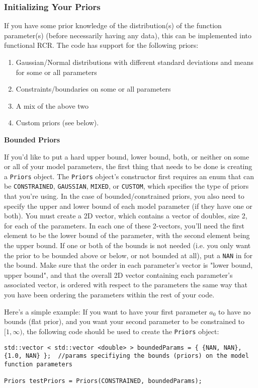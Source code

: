 \documentclass[12pt]{article}
\newcommand{\li}{\lstinline}
\begin{document}
\subsubsection{Initializing Your Priors}
\par If you have some prior knowledge of the distribution(s) of the function parameter(s) (before necessarily having any data), this can be implemented into functional RCR. The code has support for the following priors:
\begin{enumerate}
	\item Gaussian/Normal distributions with different standard deviations and means for some or all parameters
	\item Constraints/boundaries on some or all parameters
	\item A mix of the above two
	\item Custom priors (see below).
\end{enumerate} 
\textbf{Bounded Priors}
\par If you'd like to put a hard upper bound, lower bound, both, or neither on some or all of your model parameters, the first thing that needs to be done is creating a \lstinline{Priors} object. The \li{Priors} object's constructor first requires an enum that can be \li{CONSTRAINED}, \li{GAUSSIAN}, \li{MIXED}, or \li{CUSTOM}, which specifies the type of priors that you're using. In the case of bounded/constrained priors, you also need to specify the upper and lower bound of each model parameter (if they have one or both). You must create a 2D vector, which contains a vector of doubles, size 2, for each of the parameters. In each one of these 2-vectors, you'll need the first element to be the lower bound of the parameter, with the second element being the upper bound. If one or both of the bounds is not needed (i.e. you only want the prior to be bounded above or below, or not bounded at all), put a \li{NAN} in for the bound. Make sure that the order in each parameter's vector is "lower bound, upper bound", and that the overall 2D vector containing each parameter's associated vector, is ordered with respect to the parameters the same way that you have been ordering the parameters within the rest of your code.
\par Here's a simple example: If you want to have your first parameter $a_0$ to have no bounds (flat prior), and you want your second parameter to be constrained to $[1,\infty)$, the following code should be used to create the \li{Priors} object:
\begin{lstlisting}
std::vector < std::vector <double> > boundedParams = { {NAN, NAN}, {1.0, NAN} };  //params specifiying the bounds (priors) on the model function parameters

Priors testPriors = Priors(CONSTRAINED, boundedParams);
\end{lstlisting}
\end{document}
